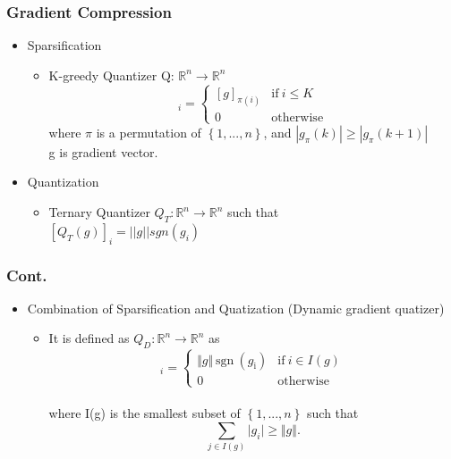 \documentclass{beamer}
\begin{document}
\begin{frame}
\frametitle{Gradient Compression}
\begin{itemize}
\item Sparsification
\begin{itemize}
	\item 
	K-greedy Quantizer Q: $\mathbb{R}^{n} \to \mathbb{R}^{n}$
	\begin{equation*} [Q_{G}^{K}(g)]_{i}=\begin{cases} [g]_{\pi(i)} & \mathrm{i}\mathrm{f}\ i\leq K\\ 0 & \mathrm{otherwise} \end{cases} \end{equation*}
	where $\pi$ is a permutation of $\left\{1, . . . , n\right\}$, and $|g_{\pi}(k)| \geq |g_{\pi}(k+1)|$
\\ g is gradient vector.

\end{itemize}	
\end{itemize}
\begin{itemize}
\item Quantization
\begin{itemize}
\item 
Ternary Quantizer $Q_T:\mathbb{R}^{n} \to \mathbb{R}^{n}$ such that
\\
${[Q_T(g)]}_i = ||g|| sgn(g_i)$
\end{itemize}
\end{itemize}
\end{frame}

\begin{frame}
\frametitle{Cont.}
\begin{itemize}
\item
Combination of Sparsification and Quatization (Dynamic gradient quatizer)
\begin{itemize}
\item 
It is defined as $Q_D : \mathbb{R}^{n} \to \mathbb{R}^{n}$ as \\
\begin{equation*} [Q_{D}(g)]_{i}=\begin{cases} \Vert g\Vert\ \mathrm{s}\mathrm{g}\mathrm{n}\ (g_{\mathrm{i}}) & \mathrm{i}\mathrm{f}\ i\in I(g)\\ 0 & \mathrm{otherwise} \end{cases} \end{equation*}
\\
where I(g) is the smallest subset of $\left\{1, . . . , n\right\}$ such that\\
\begin{equation*} \sum_{j\in I(g)}\vert g_{i}\vert \geq\Vert g\Vert. \end{equation*}

\end{itemize}
\end{itemize}

\end{frame}
\end{document}
